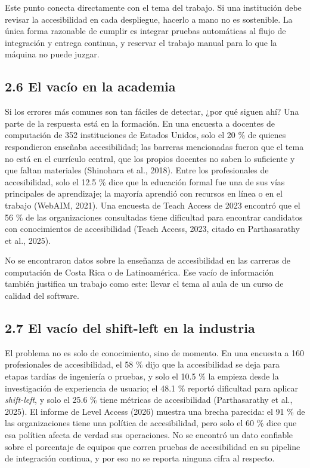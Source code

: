 \documentclass[10pt,letterpaper,onecolumn]{IEEEtran}
\begin{document}
Este punto conecta directamente con el tema del trabajo. Si una institución debe revisar la accesibilidad en cada despliegue, hacerlo a mano no es sostenible. La única forma razonable de cumplir es integrar pruebas automáticas al flujo de integración y entrega continua, y reservar el trabajo manual para lo que la máquina no puede juzgar.

\subsection{2.6 El vacío en la academia}\label{el-vacuxedo-en-la-academia}

Si los errores más comunes son tan fáciles de detectar, ¿por qué siguen ahí? Una parte de la respuesta está en la formación. En una encuesta a docentes de computación de 352 instituciones de Estados Unidos, solo el 20 \% de quienes respondieron enseñaba accesibilidad; las barreras mencionadas fueron que el tema no está en el currículo central, que los propios docentes no saben lo suficiente y que faltan materiales (Shinohara et al., 2018). Entre los profesionales de accesibilidad, solo el 12.5 \% dice que la educación formal fue una de sus vías principales de aprendizaje; la mayoría aprendió con recursos en línea o en el trabajo (WebAIM, 2021). Una encuesta de Teach Access de 2023 encontró que el 56 \% de las organizaciones consultadas tiene dificultad para encontrar candidatos con conocimientos de accesibilidad (Teach Access, 2023, citado en Parthasarathy et al., 2025).

No se encontraron datos sobre la enseñanza de accesibilidad en las carreras de computación de Costa Rica o de Latinoamérica. Ese vacío de información también justifica un trabajo como este: llevar el tema al aula de un curso de calidad del software.

\subsection{2.7 El vacío del shift-left en la industria}\label{el-vacuxedo-del-shift-left-en-la-industria}

El problema no es solo de conocimiento, sino de momento. En una encuesta a 160 profesionales de accesibilidad, el 58 \% dijo que la accesibilidad se deja para etapas tardías de ingeniería o pruebas, y solo el 10.5 \% la empieza desde la investigación de experiencia de usuario; el 48.1 \% reportó dificultad para aplicar \emph{shift-left}, y solo el 25.6 \% tiene métricas de accesibilidad (Parthasarathy et al., 2025). El informe de Level Access (2026) muestra una brecha parecida: el 91 \% de las organizaciones tiene una política de accesibilidad, pero solo el 60 \% dice que esa política afecta de verdad sus operaciones. No se encontró un dato confiable sobre el porcentaje de equipos que corren pruebas de accesibilidad en su pipeline de integración continua, y por eso no se reporta ninguna cifra al respecto.
\end{document}
